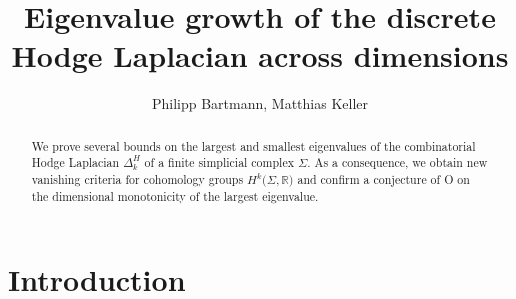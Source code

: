 \documentclass[10pt]{amsart}
\theoremstyle{definition}
\newcommand{\Hmm}[1]{\leavevmode{\marginpar{\tiny%
			$\hbox to 0mm{\hspace*{-0.5mm}$\leftarrow$\hss}%
			\vcenter{\vrule depth 0.1mm height 0.1mm width \the\marginparwidth}%
			\hbox to 0mm{\hss$\rightarrow$\hspace*{-0.5mm}}$\\\relax\raggedright #1}}}
\begin{document}
	\author[P. Bartmann, M. Keller]{Philipp Bartmann, Matthias Keller}
	
	\address{Philipp Bartmann: Institut f\"ur Mathematik, Universit\"at Potsdam
		14476  Potsdam, Germany}
    \address{Matthias Keller:   Israel Institute of Advanced Studies, Jerusalem, Israel; Institut f\"ur Mathematik, Universit\"at Potsdam
14476  Potsdam, Germany}
	
	
	
	\title[Eigenvalue growth of the discrete Hodge Laplacian across dimensions]{Eigenvalue growth of the discrete Hodge Laplacian across dimensions}
	

\begin{abstract}
We prove several bounds on the largest and smallest eigenvalues of the combinatorial Hodge Laplacian $\Delta^H_k$ of a finite simplicial complex $\Sigma.$ As a consequence, we obtain new vanishing criteria for cohomology groups $H^k(\Sigma,\mathbb{R)}$ and confirm a conjecture of O on the dimensional monotonicity of the largest eigenvalue.
\end{abstract}
\maketitle

\section{Introduction}
\end{document}
